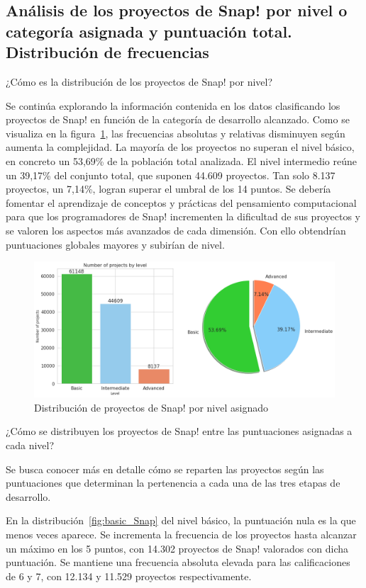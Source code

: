 \documentclass[a4paper, 12pt]{book}
\begin{document}
\subsection{Análisis de los proyectos de Snap! por nivel o categoría asignada y puntuación total. Distribución de frecuencias}
\label{subsec:frec_nivel_Snap}

¿Cómo es la distribución de los proyectos de Snap! por nivel?

Se continúa explorando la información contenida en los datos clasificando los proyectos de Snap! en función de la categoría de desarrollo alcanzado. Como se visualiza en la figura~\ref{fig:level_Snap}, las frecuencias absolutas y relativas disminuyen según aumenta la complejidad. La mayoría de los proyectos no superan el nivel básico, en concreto un 53,69\% de la población total analizada. El nivel intermedio reúne un 39,17\% del conjunto total, que suponen 44.609 proyectos. Tan solo 8.137 proyectos, un 7,14\%, logran superar el umbral de los 14 puntos. Se debería fomentar el aprendizaje de conceptos y prácticas del pensamiento computacional para que los programadores de Snap! incrementen la dificultad de sus proyectos y se valoren los aspectos más avanzados de cada dimensión. Con ello obtendrían puntuaciones globales mayores y subirían de nivel.

\begin{figure}[H]
    \centering
    \includegraphics[width=.95\textwidth]{img/freq_level_Snap.png}
    \caption{Distribución de proyectos de Snap! por nivel asignado}\label{fig:level_Snap}
\end{figure}

¿Cómo se distribuyen los proyectos de Snap! entre las puntuaciones asignadas a cada nivel?

Se busca conocer más en detalle cómo se reparten las proyectos según las puntuaciones que determinan la pertenencia a cada una de las tres etapas de desarrollo.

En la distribución~\ref{fig:basic_Snap} del nivel básico, la puntuación nula es la que menos veces aparece. Se incrementa la frecuencia de los proyectos hasta alcanzar un máximo en los 5 puntos, con 14.302 proyectos de Snap! valorados con dicha puntuación. Se mantiene una frecuencia absoluta elevada para las calificaciones de 6 y 7, con 12.134 y 11.529 proyectos respectivamente.
\end{document}
